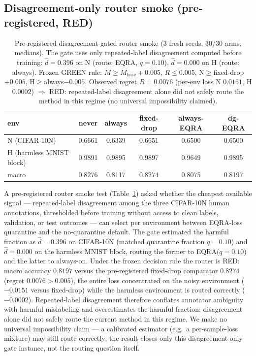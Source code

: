 \documentclass{article}
\begin{document}
\subsection{Disagreement-only router smoke (pre-registered, RED)}
\label{app:dgrouter}
\begin{table}[h]
\centering\small
\begin{tabular}{@{}lccccc@{}}
\toprule
env & never & always & fixed-drop & always-EQRA & dg-EQRA \\
\midrule
N (CIFAR-10N) & 0.6661 & 0.6339 & 0.6651 & 0.6500 & 0.6500 \\
H (harmless MNIST block) & 0.9891 & 0.9895 & 0.9897 & 0.9649 & 0.9895 \\
\midrule
macro & 0.8276 & 0.8117 & 0.8274 & 0.8075 & 0.8197 \\
\bottomrule
\end{tabular}
\caption{Pre-registered disagreement-gated router smoke (3 fresh seeds, 30/30 arms,
medians). The gate uses only repeated-label disagreement computed before training:
$\hat d{=}0.396$ on N (route: EQRA, $q{=}0.10$), $\hat d{=}0.000$ on H (route: always).
Frozen GREEN rule: $M\ge M_{\mathrm{base}}{+}0.005$, $R\le0.005$,
N$\ge$fixed-drop${+}0.005$, H$\ge$always${-}0.005$. Observed regret $R{=}0.0076$ (per-env
loss N $0.0151$, H $0.0002$) $\Rightarrow$ RED: repeated-label disagreement alone did not
safely route the method in this regime (no universal impossibility claimed).}
\label{tab:dgrouter}
\end{table}
A pre-registered router smoke test (Table~\ref{tab:dgrouter}) asked whether the cheapest
available signal --- repeated-label disagreement among the three CIFAR-10N human annotations,
thresholded before training without access to clean labels, validation, or test outcomes ---
can select per environment between EQRA-loss quarantine and the no-quarantine default. The
gate estimated the harmful fraction as $\hat d=0.396$ on CIFAR-10N (matched quarantine
fraction $q=0.10$) and $\hat d=0.000$ on the harmless MNIST block, routing the former to
EQRA($q{=}0.10$) and the latter to always-on. Under the frozen decision rule the router is
RED: macro accuracy $0.8197$ versus the pre-registered fixed-drop comparator $0.8274$
(regret $0.0076 > 0.005$), the entire loss concentrated on the noisy environment ($-0.0151$
versus fixed-drop) while the harmless environment is routed correctly ($-0.0002$).
Repeated-label disagreement therefore conflates annotator ambiguity with harmful mislabeling
and overestimates the harmful fraction: disagreement alone did not safely route the current
method in this regime. We make no universal impossibility claim --- a calibrated estimator
(e.g.\ a per-sample-loss mixture) may still route correctly; the result closes only this
disagreement-only gate instance, not the routing question itself.
\end{document}
